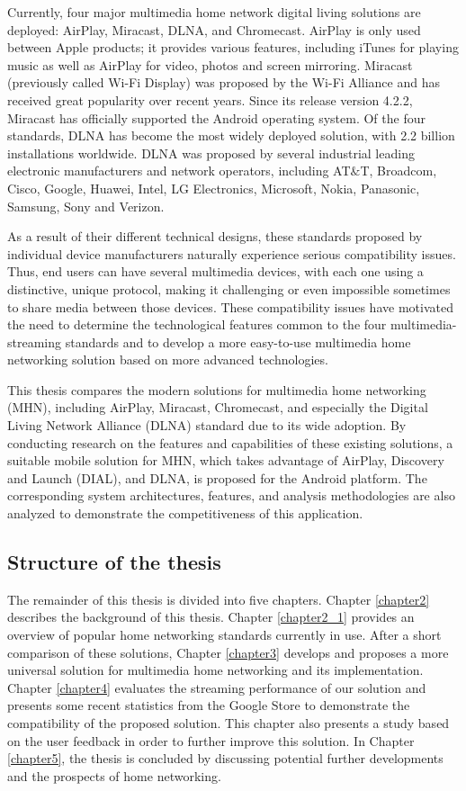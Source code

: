 Currently, four major multimedia home network digital living solutions  are
deployed: AirPlay, Miracast, DLNA, and Chromecast. AirPlay is only used
between Apple products; it provides various features, including iTunes for
playing music as well as AirPlay for video, photos and screen mirroring.
Miracast (previously called Wi-Fi Display) was proposed by the Wi-Fi Alliance
and has received great popularity over recent years. Since its release version
4.2.2, Miracast has officially supported the Android operating system. Of the
four standards, DLNA has become the most widely deployed solution, with 2.2
billion installations worldwide. DLNA was proposed by several industrial
leading electronic manufacturers and network operators, including AT$\&$T,
Broadcom, Cisco, Google, Huawei, Intel, LG Electronics, Microsoft, Nokia,
Panasonic, Samsung, Sony and Verizon.

As a result of their different technical designs, these standards proposed by
individual device manufacturers naturally experience serious compatibility
issues. Thus, end users can have several multimedia devices, with each one
using a distinctive, unique protocol, making it challenging or even impossible
sometimes to share media between those devices. These compatibility issues have
motivated the need to determine the technological features common to the four
multimedia-streaming standards and to develop a more easy-to-use multimedia
home networking solution based on more advanced technologies.

This thesis compares the modern solutions for multimedia home networking (MHN),
including AirPlay, Miracast, Chromecast, and especially the Digital Living
Network Alliance (DLNA) standard due to its wide adoption. By conducting
research on the features and capabilities of these existing solutions, a
suitable mobile solution for MHN, which takes advantage of AirPlay, Discovery
and Launch (DIAL), and DLNA, is proposed for the Android platform. The
corresponding system architectures, features, and analysis methodologies are
also analyzed to demonstrate the competitiveness of this application.

\subsection{Structure of the thesis}
The remainder of this thesis is divided into five chapters. Chapter
\ref{chapter2} describes the background of this thesis. Chapter \ref{chapter2_1}
provides an overview of popular home networking standards currently in use.
After a short comparison of these solutions, Chapter \ref{chapter3} develops
and proposes a more universal solution for multimedia home networking and its
implementation.
Chapter \ref{chapter4} evaluates the streaming performance of our solution and
presents some recent statistics from the Google Store to demonstrate the
compatibility of the proposed solution. This chapter also presents a study
based on the user feedback in order to further improve this solution. In
Chapter \ref{chapter5}, the thesis is concluded by  discussing potential 
further developments and the prospects of home networking.
